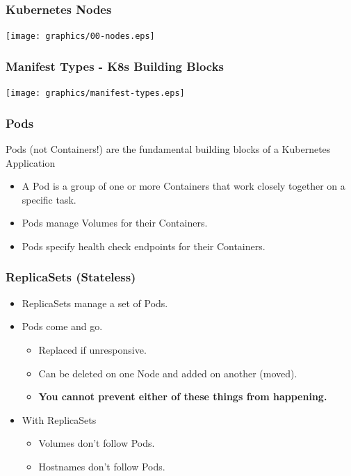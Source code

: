     \begin{frame}
        \frametitle{Kubernetes Nodes}
        \texttt{[image: graphics/00-nodes.eps]}
    \end{frame}

    \begin{frame}
        \frametitle{Manifest Types - K8s Building Blocks}
        \texttt{[image: graphics/manifest-types.eps]}
    \end{frame}

    \begin{frame}
        \frametitle{Pods}
        Pods (not Containers!) are the fundamental building blocks of a Kubernetes Application\pause
        \begin{itemize}
            \item A Pod is a group of one or more Containers that work closely together on a specific task.\pause
            \item Pods manage Volumes for their Containers.\pause
            \item Pods specify health check endpoints for their Containers.
        \end{itemize}
    \end{frame}

    \begin{frame}
        \frametitle{ReplicaSets (Stateless)}
        \begin{itemize}
            \item ReplicaSets manage a set of Pods.\pause
            \item Pods come and go.\pause
            \begin{itemize}
                \item Replaced if unresponsive.\pause
                \item Can be deleted on one Node and added on another (moved).\pause
                \item \textbf{You cannot prevent either of these things from happening.}\pause
            \end{itemize}
            \item With ReplicaSets\pause
            \begin{itemize}
                \item Volumes don't follow Pods.\pause
                \item Hostnames don't follow Pods.
            \end{itemize}
        \end{itemize}
    \end{frame}

